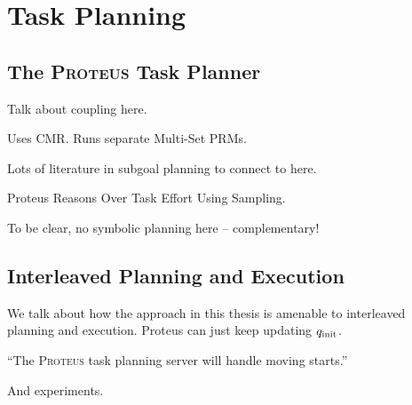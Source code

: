 \section{Task Planning}
\label{chap:task-planning}

\subsection{The \textsc{Proteus} Task Planner}

Talk about coupling here.

Uses CMR.
Runs separate Multi-Set PRMs.

Lots of literature in subgoal planning to connect to here.

Proteus Reasons Over Task Effort Using Sampling.

To be clear, no symbolic planning here --
complementary!

\subsection{Interleaved Planning and Execution}
\label{sec:interleaved}

We talk about how the approach in this thesis is
amenable to interleaved planning and execution.
Proteus can just keep updating $q_{\mbox{\scriptsize init}}$.

``The \textsc{Proteus} task planning server
will handle moving starts.''

And experiments.
